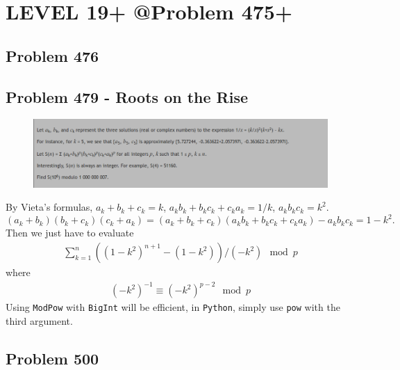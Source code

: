 \chapter{LEVEL 19+ @Problem 475+}
\section{Problem 476}
\begin{prob}
\end{prob}

\section{Problem 479 - Roots on the Rise}
\begin{prob}
	\begin{figure}[htb!]
		\begin{center}
			\includegraphics[scale = 0.4]{pic/479.png}
		\end{center}
	\end{figure}
\end{prob}
\begin{sol}
By Vieta's formulas, $a_k + b_k + c_k = k$, $a_kb_k + b_kc_k + c_ka_k = 1/k$, $a_kb_kc_k = k^2$.
$$
(a_k + b_k)(b_k + c_k)(c_k + a_k) = (a_k + b_k + c_k)(a_kb_k + b_kc_k + c_ka_k) -a_kb_kc_k = 1 - k^2.
$$
Then we just have to evaluate
\begin{eqnarray}
\sum_{k = 1}^n ((1 - k^2)^{n + 1} - (1 - k^2))/(- k^2) \mod p
\end{eqnarray}
where 
\begin{eqnarray}
(-k^2)^{-1} \equiv (-k^2)^{p-2} \mod{p}
\end{eqnarray}
Using \texttt{ModPow} with \texttt{BigInt} will be efficient, in \texttt{Python}, simply use \texttt{pow} with the third argument.
\end{sol}
\section{Problem 500}
\begin{prob}
\end{prob}